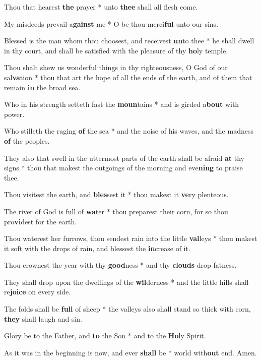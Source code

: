 \begin{multicols}{2}
	Thou that hearest \textbf{the} prayer * unto \textbf{thee} shall all flesh come.
	
	My misdeeds prevail a\textbf{gainst} me * O be thou merci\textbf{ful} unto our sins.
	
	Blessed is the man whom thou choosest, and receivest \textbf{un}to thee * he shall dwell in thy court, and shall be satisfied with the pleasure of thy \textbf{ho}ly temple.
	
	Thou shalt shew us wonderful things in thy righteousness, O God of our sal\textbf{va}tion * thou that art the hope of all the ends of the earth, and of them that remain \textbf{in} the broad sea.
	
	Who in his strength setteth fast the \textbf{moun}tains * and is girded a\textbf{bout} with power.
	
	Who stilleth the raging \textbf{of} the sea * and the noise of his waves, and the madness \textbf{of} the peoples.
	
	They also that swell in the uttermost parts of the earth shall be afraid \textbf{at} thy signs * thou that makest the outgoings of the morning and eve\textbf{ning} to praise thee.
	
	Thou visitest the earth, and \textbf{bles}sest it * thou makest it \textbf{ve}ry plenteous.
	
	The river of God is full of \textbf{wa}ter * thou preparest their corn, for so thou pro\textbf{vi}dest for the earth.
	
	Thou waterest her furrows, thou sendest rain into the little \textbf{val}leys * thou makest it soft with the drops of rain, and blessest the \textbf{in}crease of it.
	
	Thou crownest the year with thy \textbf{good}ness * and thy \textbf{clouds} drop fatness.
	
	They shall drop upon the dwellings of the \textbf{wil}derness * and the little hills shall re\textbf{joice} on every side.
	
	The folds shall be \textbf{full} of sheep * the valleys also shall stand so thick with corn, \textbf{they} shall laugh and sin.
	
	Glory be to the Father, and \textbf{to} the Son * and to the \textbf{Ho}ly Spirit.
	
	As it was in the beginning is now, and ever \textbf{shall} be * world with\textbf{out} end. Amen.
\end{multicols}